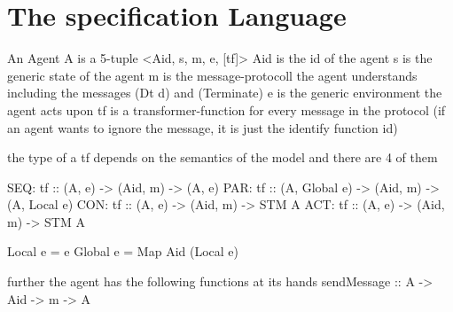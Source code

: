 \section{The specification Language}

An Agent A is a 5-tuple <Aid, s, m, e, [tf]>
Aid is the id of the agent
s is the generic state of the agent
m is the message-protocoll the agent understands including the messages (Dt d) and (Terminate)
e is the generic environment the agent acts upon
tf is a transformer-function for every message in the protocol (if an agent wants to ignore the message, it is just the identify function id)

the type of a tf depends on the semantics of the model and there are 4 of them

SEQ: tf :: (A, e) -> (Aid, m) -> (A, e)
PAR: tf :: (A, Global e) -> (Aid, m) -> (A, Local e)
CON: tf :: (A, e) -> (Aid, m) -> STM A
ACT: tf :: (A, e) -> (Aid, m) -> STM A

Local e = e
Global e = Map Aid (Local e)

further the agent has the following functions at its hands
sendMessage :: A -> Aid -> m -> A

